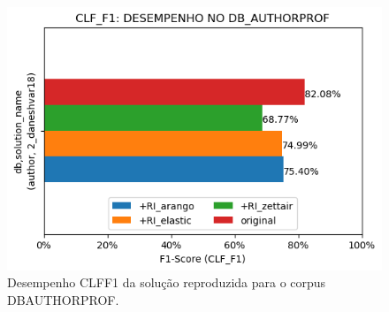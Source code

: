 \begin{figure}[ht]
    \centering
    \caption{Desempenho CLF\underscore{}F1 da solução reproduzida para o corpus DB\underscore{}AUTHORPROF.}
    \vspace{-0.5cm}
    \begin{center}
        \includegraphics[scale=0.75]{img/clf-f1-bars-authorprof.png}
    \end{center}
    \vspace{-0.5cm}
    \label{fig:clf-f1-bars-authorprof}
\end{figure}